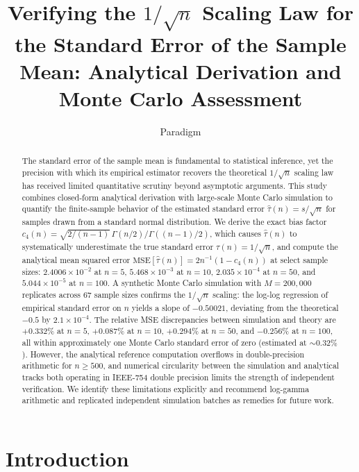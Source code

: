 \documentclass[11pt]{article}
\title{Verifying the $1/\sqrt{n}$ Scaling Law for the Standard Error of the Sample Mean: Analytical Derivation and Monte Carlo Assessment}
\author{Paradigm}
\date{}
\begin{document}
\maketitle
\begin{abstract}

The standard error of the sample mean is fundamental to statistical inference, yet the precision with which its empirical estimator recovers the theoretical $1/\sqrt{n}$ scaling law has received limited quantitative scrutiny beyond asymptotic arguments. This study combines closed-form analytical derivation with large-scale Monte Carlo simulation to quantify the finite-sample behavior of the estimated standard error $\hat{\tau}(n) = s/\sqrt{n}$ for samples drawn from a standard normal distribution. We derive the exact bias factor $c_4(n) = \sqrt{2/(n-1)}\,\Gamma(n/2)/\Gamma((n-1)/2)$, which causes $\hat{\tau}(n)$ to systematically underestimate the true standard error $\tau(n) = 1/\sqrt{n}$, and compute the analytical mean squared error $\mathrm{MSE}[\hat{\tau}(n)] = 2n^{-1}(1 - c_4(n))$ at select sample sizes: $2.4006 \times 10^{-2}$ at $n=5$, $5.468 \times 10^{-3}$ at $n=10$, $2.035 \times 10^{-4}$ at $n=50$, and $5.044 \times 10^{-5}$ at $n=100$. A synthetic Monte Carlo simulation with $M = 200{,}000$ replicates across 67 sample sizes confirms the $1/\sqrt{n}$ scaling: the log-log regression of empirical standard error on $n$ yields a slope of $-0.50021$, deviating from the theoretical $-0.5$ by $2.1 \times 10^{-4}$. The relative MSE discrepancies between simulation and theory are $+0.332\%$ at $n=5$, $+0.087\%$ at $n=10$, $+0.294\%$ at $n=50$, and $-0.256\%$ at $n=100$, all within approximately one Monte Carlo standard error of zero (estimated at $\sim 0.32\%$). However, the analytical reference computation overflows in double-precision arithmetic for $n \geq 500$, and numerical circularity between the simulation and analytical tracks both operating in IEEE-754 double precision limits the strength of independent verification. We identify these limitations explicitly and recommend log-gamma arithmetic and replicated independent simulation batches as remedies for future work.

\end{abstract}
\section{Introduction}
\end{document}
